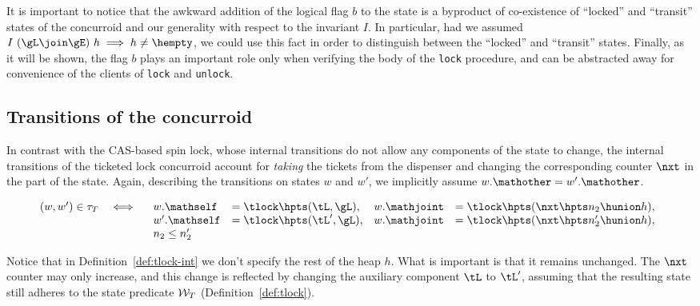 It is important to notice that the awkward addition of the logical
flag $b$ to the \joint state is a byproduct of co-existence of
``locked'' and ``transit'' states of the concurroid and our generality
with respect to the invariant $I$. In particular, had we assumed
$I~(\gL \join \gE)\ h \implies h \neq \hempty$, we could use this fact
in order to distinguish between the ``locked'' and ``transit''
states. Finally, as it will be shown, the flag $b$ plays an important
role only when verifying the body of the \texttt{lock} procedure, and
can be abstracted away for convenience of the clients of \texttt{lock}
and \texttt{unlock}.

\subsection{Transitions of the concurroid}
\label{sec:trans-conc}

In contrast with the CAS-based spin lock, whose internal transitions
do not allow any components of the state to change, the internal
transitions of the ticketed lock concurroid account for \emph{taking}
the tickets from the dispenser and changing the corresponding counter
$\nxt$ in the \joint part of the state. Again, describing the
transitions on states $w$ and $w'$, we implicitly assume $w. \mathother = w'.\mathother$.

\begin{definition}
\label{def:tlock-int}
\[
\begin{array}{lcl}
(w, w') \in \tau_T & \iff & 
\begin{array}[t]{llll}
w.\mathself & = \tlock \hpts (\tL, \gL), & w.\mathjoint & = \tlock
\hpts (\nxt \hpts n_2 \hunion h), \\
w'.\mathself & = \tlock \hpts (\tL', \gL), & w.\mathjoint & = \tlock
\hpts (\nxt \hpts n'_2 \hunion h), \\
n_2 \le n'_2
\end{array}\\  
\end{array}
\]
  
\end{definition}

Notice that in Definition~\ref{def:tlock-int} we don't specify the
rest of the \joint heap $h$. What is important is that it remains
unchanged. The $\nxt$ counter may only increase, and this change is
reflected by changing the \self auxiliary component $\tL$ to
$\tL'$, assuming that the resulting state still adheres to the state
predicate ${\cal W}_T$ (Definition~\ref{def:tlock}).

